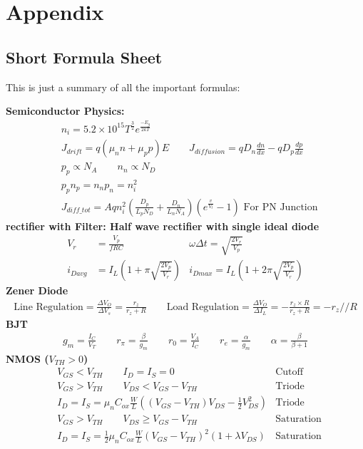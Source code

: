 \documentclass[12pt,letterpaper]{article} \usepackage{amsmath} \usepackage{graphicx} \usepackage[margin=1in]{geometry} \usepackage{longtable}  \usepackage{amssymb}
\begin{document}
	
	\newpage
	\section{Appendix}
	\subsection{Short Formula Sheet}
	This is just a summary of all the important formulas:
	
\textbf{Semiconductor Physics:}
	\begin{align*}
&		n_i = 5.2\times 10^{15} T^{\frac{3}{2}} e^\frac{-E_g}{2kT}\\
&		J_{drift} = q(\mu_n n+ \mu_p p) E \qquad J_{diffusion} = qD_n \frac{dn}{dx} - qD_p \frac{dp}{dx}\\
&		p_p \propto N_A \qquad n_n \propto N_D\\
&		p_pn_p = n_np_n = n_i^2\\
& 		J_{diff\_tot} = Aqn_i^2\left(\frac{D_p}{L_pN_D}+\frac{D_n}{L_nN_A}\right)\left(e^{\frac{v}{V_t}}-1\right) \text{ For PN Junction}
	\end{align*}
	\textbf{rectifier with Filter: Half wave rectifier with single ideal diode}
	\begin{align*}
		V_r &= \frac{V_p}{fRC} &\omega\Delta t = \sqrt{\frac{2V_r}{V_p}} \\
		i_{Davg} &= I_L(1+\pi\sqrt{\frac{2V_p}{V_r}}) &i_{Dmax} = I_L(1+2\pi\sqrt{\frac{2V_p}{V_r}}) 
	\end{align*}
	\textbf{Zener Diode}
	\begin{align*}
		\text{Line Regulation}=\frac{\Delta V_O}{\Delta V_s} = \frac{r_z}{r_z+R} \qquad \text{Load Regulation}=\frac{\Delta V_O}{\Delta I_L} = -\frac{r_z\times R}{r_z+R} = -r_z // R
	\end{align*}
	\textbf{BJT}
	\begin{align*}
		g_m = \frac{I_C}{V_T} \qquad r_\pi = \frac{\beta}{g_m} \qquad r_0 = \frac{V_A}{I_C} \qquad r_e = \frac{\alpha}{g_m} \qquad \alpha = \frac{\beta}{\beta+1}
	\end{align*}
	\textbf{NMOS ($V_{TH}>0$)}
	\begin{align*}
		&V_{GS} < V_{TH} \qquad I_D = I_S = 0 &\text{Cutoff}\\
		&V_{GS} > V_{TH} \qquad V_{DS} < V_{GS} - V_{TH} &\text{Triode}\\
		&I_D = I_S = \mu_n C_{ox} \frac{W}{L} \left((V_{GS}-V_{TH})V_{DS} - \frac{1}{2}V^2_{DS}\right)&\text{Triode}\\
		&V_{GS} > V_{TH} \qquad V_{DS} \ge V_{GS} - V_{TH}&\text{Saturation}\\
		&I_D = I_S = \frac{1}{2}\mu_n C_{ox} \frac{W}{L} (V_{GS} - V_{TH})^2(1+\lambda V_{DS})&\text{Saturation}
	\end{align*}
\end{document}
